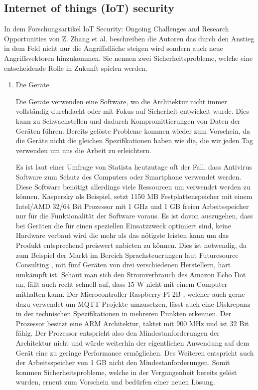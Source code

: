     \subsection{Internet of things (IoT) security}
    In dem Forschungsartikel \glqq IoT Security: Ongoing Challenges and Research Opportunities\grqq{} von Z. Zhang et al. \cite{6978614} beschreiben die Autoren das durch den Anstieg in dem Feld nicht nur die Angriffsfläche steigen wird sondern auch neue Angriffsvektoren hinzukommen.
    Sie nennen zwei Sicherheitsprobleme, welche eine entscheidende Rolle in Zukunft spielen werden.
    \begin{enumerate}
        \item Die Geräte
        
        Die Geräte verwenden eine Software, wo die Architektur nicht immer vollständig durchdacht oder mit Fokus auf Sicherheit entwickelt wurde. Dies kann zu Schwachstellen und dadurch Kompromittierungen von Daten der Geräten führen. Bereits gelöste Probleme kommen wieder zum Vorschein, da die Geräte nicht die gleichen Spezifikationen haben wie die, die wir jeden Tag verwenden um uns die Arbeit zu erleichtern. 
    
        Es ist laut einer Umfrage von Statista \cite{kaspersky_lab_2019}
        heutzutage oft der Fall, dass Antivirus Software zum Schutz des Computers oder Smartphone verwendet werden. Diese Software benötigt allerdings viele Ressourcen um verwendet werden zu können.
        Kaspersky \cite{ao_kaspersky_lab_2018_1}
        als Beispiel, setzt 1150 MB Festplattenspeicher mit einem Intel/AMD 32/64 Bit Prozessor mit 1 GHz und 1 GB freien Arbeitsspeicher nur für die Funktionalität der Software voraus. Es ist davon auszugehen, dass bei Geräten die für einen speziellen Einsatzzweck optimiert sind, keine Hardware verbaut wird die mehr als das nötigste leisten kann um das Produkt entsprechend preiswert anbieten zu können. Dies ist notwendig, da zum Beispiel der Markt im Bereich Sprachsteuerungen laut Futuresource Consulting \cite{futuresource_consulting_ltd_2019}, mit fünf Geräten von drei verschiedenen Herstellern, hart umkämpft ist. Schaut man sich den Stromverbrauch des Amazon Echo Dot \cite{amazon_de_alle_produkte_2018} an, fällt auch recht schnell auf, dass 15 W nicht mit einem Computer mithalten kann. 
        Der Microcontroller Raspberry Pi 2B \cite{raspberry_pi_foundation_2016}, welcher auch gerne dazu verwendet um \ac{MQTT} Projekte umzusetzen, lässt auch eine Diskrepanz in der technischen Spezifikationen in mehreren Punkten erkennen. Der Prozessor besitzt eine ARM Architektur, taktet mit 900 MHz 
        und ist 32 Bit fähig. Der Prozessor entspricht also den Mindestanforderungen der Architektur nicht und würde weiterhin der eigentlichen Anwendung auf dem Gerät eine zu geringe Performance ermöglichen. Des Weiteren entspricht auch der Arbeitsspeicher von 1 GB nicht den Mindestanforderungen.
        Somit kommen Sicherheitsprobleme, welche in der Vergangenheit bereits gelöst wurden, erneut zum Vorschein und bedürfen einer neuen Lösung.
        

\end{enumerate}
